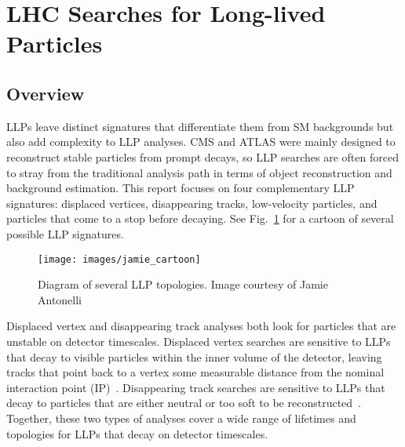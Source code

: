 \documentclass[12pt]{article}
\begin{document}
\section{LHC Searches for Long-lived Particles} \label {analyses}
    \subsection{Overview}
        LLPs leave distinct signatures that differentiate them from SM backgrounds but also add complexity to LLP analyses. CMS and ATLAS were mainly designed to reconstruct stable particles from prompt decays, so LLP searches are often forced to stray from the traditional analysis path in terms of object reconstruction and background estimation. This report focuses on four complementary LLP signatures: displaced vertices, disappearing tracks, low-velocity particles, and particles that come to a stop before decaying. See Fig.~\ref{jamie_cartoon} for a cartoon of several possible LLP signatures.

        \noindent \begin{figure}[htbp] \begin{center}
        \texttt{[image: images/jamie\_cartoon]}
        \caption{Diagram of several LLP topologies. Image courtesy of Jamie Antonelli}
        \label{jamie_cartoon}
        \end{center} \end{figure}

        Displaced vertex and disappearing track analyses both look for particles that are unstable on detector timescales. Displaced vertex searches are sensitive to LLPs that decay to visible particles within the inner volume  of the detector, leaving tracks that point back to a vertex some measurable distance from the nominal interaction point (IP)~\cite{atlas_displaced}. Disappearing track searches are sensitive to LLPs that decay to particles that are either neutral or too soft to be reconstructed~\cite{atlas_disappearing}. Together, these two types of analyses cover a wide range of lifetimes and topologies for LLPs that decay on detector timescales.
\end{document}
